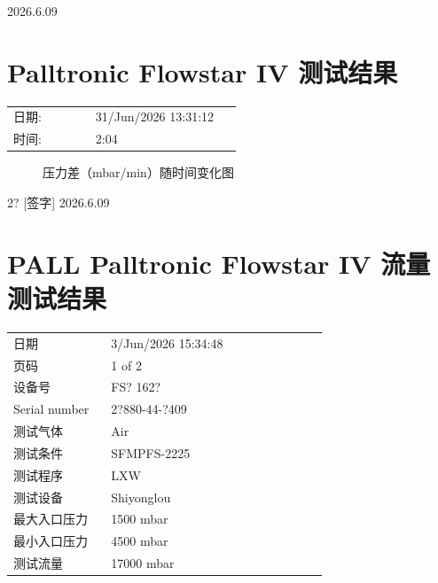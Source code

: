 \documentclass[UTF8,10pt,a4paper,fontset=fandol]{ctexart}
\newcommand{\fieldvalue}[1]{#1}
\newcommand{\handwritten}[1]{#1}
\begin{document}
\handwritten{2026.6.09}

\section{Palltronic Flowstar IV 测试结果}

\begin{tabular}{@{}p{0.32\linewidth}p{0.58\linewidth}@{}}
日期: &
\fieldvalue{31/Jun/2026 13:31:12}
\\[2pt]
时间: &
\fieldvalue{2:04}
\end{tabular}

\begin{figure}[ht]
\centering
{}
\caption{压力差（mbar/min）随时间变化图}
\end{figure}

\handwritten{2? [签字] 2026.6.09}

\newpage

\section*{PALL Palltronic Flowstar IV 流量测试结果}

\begin{tabular}{@{}p{0.28\linewidth}p{0.62\linewidth}@{}}
日期 &
\fieldvalue{3/Jun/2026 15:34:48} \\[2pt]
页码 &
\fieldvalue{1 of 2} \\[2pt]
设备号 &
\fieldvalue{FS? 162?} \\[2pt]
Serial number &
\fieldvalue{2?880-44-?409} \\[2pt]
测试气体 &
\fieldvalue{Air} \\[2pt]
测试条件 &
\fieldvalue{SFMPFS-2225} \\[2pt]
测试程序 &
\fieldvalue{LXW} \\[2pt]
测试设备 &
\fieldvalue{Shiyonglou} \\[2pt]
最大入口压力 &
\fieldvalue{1500 mbar} \\[2pt]
最小入口压力 &
\fieldvalue{4500 mbar} \\[2pt]
测试流量 &
\fieldvalue{17000 mbar} \\
\end{tabular}
\end{document}
